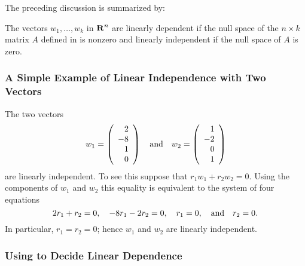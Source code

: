 The preceding discussion is summarized by:
\begin{lemma}
The vectors $w_1,\ldots,w_k$ in $\mbox{$\bf{R}$}^n$ are linearly dependent if the
null space of the $n\times k$ matrix $A$ defined in  is
nonzero and linearly independent if the null space of $A$ is zero.
\end{lemma} 


\subsubsection*{A Simple Example of Linear Independence with Two Vectors}

The two vectors
\[
w_1 = \left(\begin{array}{r} 2 \\ -8\\ 1\\ 0 \end{array}\right)
\quad\mbox{and}\quad
w_2 = \left(\begin{array}{r} 1 \\ -2\\ 0\\ 1 \end{array}\right)
\]
are linearly independent.  To see this suppose that
$r_1 w_1 + r_2 w_2 = 0$.  Using the components of $w_1$ and $w_2$
this equality is equivalent to the system of four equations
\[
2r_1 + r_2 = 0,\quad -8r_1 - 2r_2 = 0,\quad r_1 = 0, \quad\mbox{and}\quad r_2 = 0.
\]
In particular, $r_1 = r_2 = 0$; hence $w_1$ and $w_2$ are
linearly independent.


\subsubsection*{Using \Matlab to Decide Linear Dependence}

